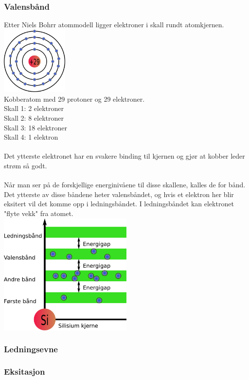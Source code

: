 \subsubsection{Valensbånd}
Etter Niels Bohrr atommodell ligger elektroner i skall rundt atomkjernen.
\\
\includegraphics[width=0.25\textwidth]{./img/bohr-Cu}
\\
Kobberatom med 29 protoner og 29 elektroner.\\
Skall 1: 2 elektroner \\
Skall 2: 8 elektroner \\
Skall 3: 18 elektroner \\
Skall 4: 1 elektron
\\\\
Det ytterste elektronet har en svakere binding til kjernen og gjør at kobber leder strøm så godt.
\\\\
Når man ser på de forskjellige energinivåene til disse skallene,
kalles de for bånd.
Det ytterste av disse båndene heter valensbåndet,
og hvis et elektron her blir eksitert vil det komme opp i ledningsbåndet.
I ledningsbåndet kan elektronet "flyte vekk" fra atomet.
\\
\includegraphics[width=0.5\textwidth]{./img/valence-Cu}



\subsubsection{Ledningsevne}




\subsubsection{Eksitasjon}

